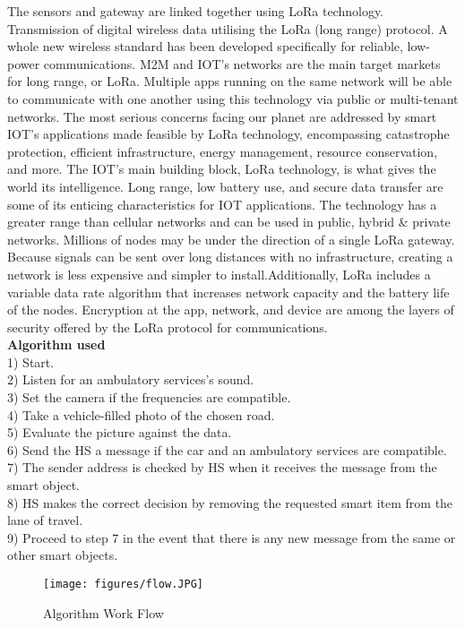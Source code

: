 \documentclass[conference]{IEEEtran}
\begin{document}
The sensors and gateway are linked together using LoRa technology. Transmission of digital wireless data utilising the LoRa (long range) protocol. A whole new wireless standard has been developed specifically for reliable, low-power communications. M2M and IOT's networks are the main target markets for long range, or LoRa. Multiple apps running on the same network will be able to communicate with one another using this technology via public or multi-tenant networks. The most serious concerns facing our planet are addressed by smart IOT's applications made feasible by LoRa technology, encompassing catastrophe protection, efficient infrastructure, energy management, resource conservation, and more. The IOT's main building block, LoRa technology, is what gives the world its intelligence. Long range, low battery use, and secure data transfer are some of its enticing characteristics for IOT applications. The technology has a greater range than cellular networks and can be used in public, hybrid & private networks. Millions of nodes may be under the direction of a single LoRa gateway. Because signals can be sent over long distances with no infrastructure, creating a network is less expensive and simpler to install.Additionally, LoRa includes a variable data rate algorithm that increases network capacity and the battery life of the nodes. Encryption at the app, network, and device are among the layers of security offered by the LoRa protocol for communications. \\

\textbf{Algorithm used}\\ 1) Start.\\ 2) Listen for an ambulatory services's sound. \\3) Set the camera if the frequencies are compatible. \\ 4) Take a vehicle-filled photo of the chosen road. \\ 5) Evaluate the picture against the data. \\ 6) Send the HS a message if the car and an ambulatory services are compatible. \\ 7) The sender address is checked by HS when it receives the message from the smart object. \\ 8) HS makes the correct decision by removing the requested smart item from the lane of travel.\\ 9) Proceed to step 7 in the event that there is any new message from the same or other smart objects.

\begin{figure}
    \centering
    \texttt{[image: figures/flow.JPG]}
    \caption{ Algorithm Work Flow}
    \label{fig:2}
\end{figure}
\end{document}
